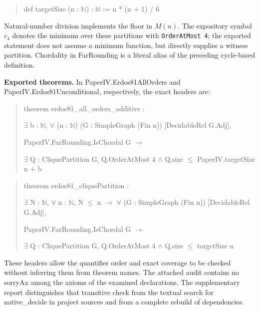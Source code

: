 \documentclass[english,11pt,a4paper]{article}
\begin{document}
\begin{quote}\footnotesize\ttfamily\raggedright
def targetSize (n : \(\mathbb N\)) : \(\mathbb N\) := n * (n + 1) / 6\par
\end{quote}

Natural-number division implements the floor in \(M(n)\). The expository symbol \(c_4\) denotes the minimum over these partitions with \texttt{OrderAtMost\ 4}; the exported statement does not assume a minimum function, but directly supplies a witness partition. Chordality in {\ttfamily\small FarRounding} is a literal alias of the preceding cycle-based definition.

\textbf{Exported theorems.} In {\ttfamily\small PaperIV.\discretionary{\hbox{\ensuremath{\hookrightarrow}}}{}{}Erdos81AllOr\discretionary{\hbox{\ensuremath{\hookrightarrow}}}{}{}ders} and {\ttfamily\small PaperIV.\discretionary{\hbox{\ensuremath{\hookrightarrow}}}{}{}Erdos81Uncon\discretionary{\hbox{\ensuremath{\hookrightarrow}}}{}{}ditional}, respectively, the exact headers are:

\begin{quote}\footnotesize\ttfamily\raggedright
theorem erdos81\_all\_orders\_additive :\par
    \(\exists\) b : \(\mathbb N\), \(\forall\) (n : \(\mathbb N\)) (G : SimpleGraph (Fin n)) [DecidableRel G.Adj],\par
      PaperIV.FarRounding.IsChordal G \(\to\)\par
        \(\exists\) Q : CliquePartition G, Q.OrderAtMost 4 \(\land\) Q.size \(\le\) PaperIV.targetSize n + b\par
\end{quote}

\begin{quote}\footnotesize\ttfamily\raggedright
theorem erdos81\_cliquePartition :\par
    \(\exists\) N : \(\mathbb N\), \(\forall\) n : \(\mathbb N\), N \(\le\) n \(\to\) \(\forall\) (G : SimpleGraph (Fin n)) [DecidableRel G.Adj],\par
      PaperIV.FarRounding.IsChordal G \(\to\)\par
        \(\exists\) Q : CliquePartition G, Q.OrderAtMost 4 \(\land\) Q.size \(\le\) targetSize n\par
\end{quote}

These headers allow the quantifier order and exact coverage to be checked without inferring them from theorem names. The attached audit contains no {\ttfamily\small sorryAx} among the axioms of the examined declarations. The supplementary report distinguishes that transitive check from the textual search for {\ttfamily\small native\_\discretionary{\hbox{\ensuremath{\hookrightarrow}}}{}{}decide} in project sources and from a complete rebuild of dependencies.
\end{document}
